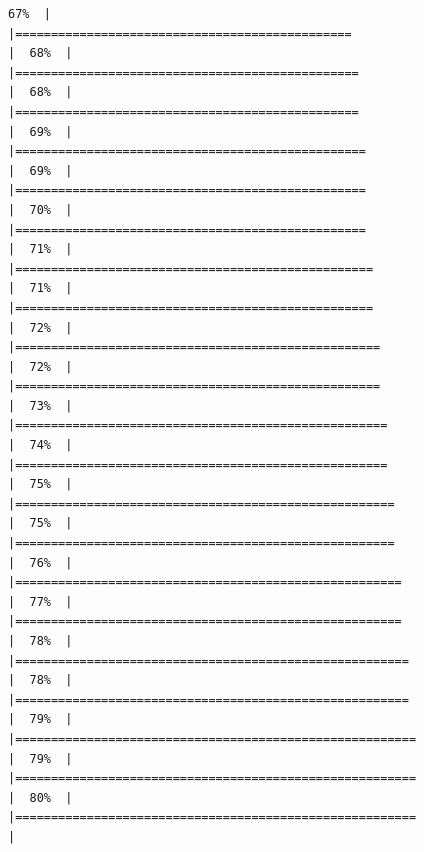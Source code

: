 \documentclass[
  english,
  man,a4paper,mask,floatsintext]{apa6}
\begin{document}
\begin{verbatim}
67%  |                                                                              |===============================================                       |  68%  |                                                                              |================================================                      |  68%  |                                                                              |================================================                      |  69%  |                                                                              |=================================================                     |  69%  |                                                                              |=================================================                     |  70%  |                                                                              |=================================================                     |  71%  |                                                                              |==================================================                    |  71%  |                                                                              |==================================================                    |  72%  |                                                                              |===================================================                   |  72%  |                                                                              |===================================================                   |  73%  |                                                                              |====================================================                  |  74%  |                                                                              |====================================================                  |  75%  |                                                                              |=====================================================                 |  75%  |                                                                              |=====================================================                 |  76%  |                                                                              |======================================================                |  77%  |                                                                              |======================================================                |  78%  |                                                                              |=======================================================               |  78%  |                                                                              |=======================================================               |  79%  |                                                                              |========================================================              |  79%  |                                                                              |========================================================              |  80%  |                                                                              |========================================================              |  
\end{verbatim}
\end{document}
